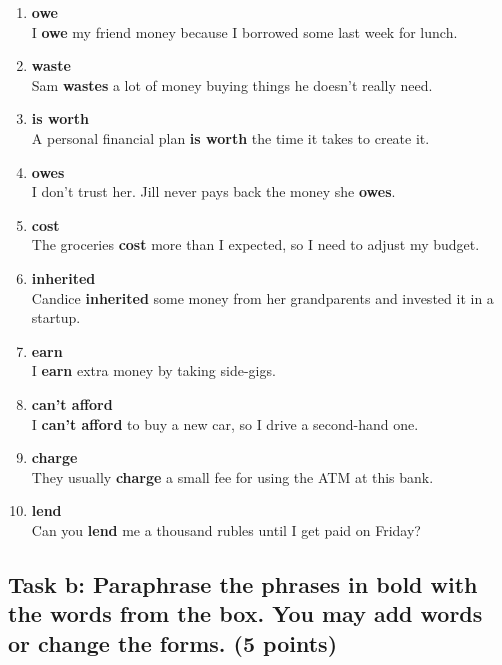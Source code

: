 \documentclass[a4paper,12pt]{article}
\begin{document}
\begin{enumerate}
    \item \textbf{owe} \\
    I \textbf{owe} my friend money because I borrowed some last week for lunch.
    
    \item \textbf{waste} \\
    Sam \textbf{wastes} a lot of money buying things he doesn't really need.
    
    \item \textbf{is worth} \\
    A personal financial plan \textbf{is worth} the time it takes to create it.
    
    \item \textbf{owes} \\
    I don't trust her. Jill never pays back the money she \textbf{owes}.
    
    \item \textbf{cost} \\
    The groceries \textbf{cost} more than I expected, so I need to adjust my budget.
    
    \item \textbf{inherited} \\
    Candice \textbf{inherited} some money from her grandparents and invested it in a startup.
    
    \item \textbf{earn} \\
    I \textbf{earn} extra money by taking side-gigs.
    
    \item \textbf{can't afford} \\
    I \textbf{can't afford} to buy a new car, so I drive a second-hand one.
    
    \item \textbf{charge} \\
    They usually \textbf{charge} a small fee for using the ATM at this bank.
    
    \item \textbf{lend} \\
    Can you \textbf{lend} me a thousand rubles until I get paid on Friday?
\end{enumerate}

\subsection{Task b: Paraphrase the phrases in bold with the words from the box. You may add words or change the forms. (5 points)}
\end{document}
